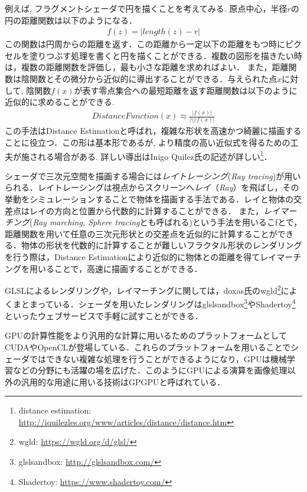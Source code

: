 例えば, フラグメントシェーダで円を描くことを考えてみる. 
原点中心，半径$r$の円の距離関数は以下のようになる．
\begin{eqnarray*}
 f(z) = | length(z) - r |
\end{eqnarray*}
この関数は円周からの距離を返す．この距離から一定以下の距離をもつ時にピクセルを塗りつぶす処理を書くと円を描くことができる．複数の図形を描きたい時は，複数の距離関数を評価し，最も小さな距離を求めればよい．
また，距離関数は陰関数とその微分から近似的に導出することができる．与えられた点$x$に対して, 陰関数$f(x)$が表す零点集合への最短距離を返す距離関数は以下のように近似的に求めることができる. 
\begin{eqnarray*}
 DistanceFunction(x) \approx \frac{|f(x)|}{|\bigtriangledown f(x)|}
\end{eqnarray*}
この手法はDistance Estimationと呼ばれ，複雑な形状を高速かつ綺麗に描画することに役立つ．この形は基本形であるが, より精度の高い近似式を得るための工夫が施される場合がある. 詳しい導出はInigo Quilez氏の記述が詳しい\footnote{distance estimation: \url{http://iquilezles.org/www/articles/distance/distance.htm}}．

シェーダで三次元空間を描画する場合には\emph{レイトレーシング}({\it Ray tracing})が用いられる．レイトレーシングは視点からスクリーンへ\emph{レイ}（{\it Ray}）を飛ばし，その挙動をシミュレーションすることで物体を描画する手法である．レイと物体の交差点はレイの方向と位置から代数的に計算することができる．
また，\emph{レイマーチング}({\it Ray marching, Sphere tracing}とも呼ばれる)\cite{sphereTracing}という手法を用いるこfとで，距離関数を用いて任意の三次元形状との交差点を近似的に計算することができる．物体の形状を代数的に計算することが難しいフラクタル形状のレンダリングを行う際は，Distance Estimationにより近似的に物体との距離を得てレイマーチングを用いることで，高速に描画することができる．

GLSLによるレンダリングや，レイマーチングに関しては，doxas氏のwgld\footnote{wgld: \url{https://wgld.org/d/glsl/}}によくまとまっている．シェーダを用いたレンダリングはglslsandbox\footnote{glslsandbox: \url{http://glslsandbox.com/}}やShadertoy\footnote{Shadertoy: \url{https://www.shadertoy.com/}}といったウェブサービスで手軽に試すことができる．

GPUの計算性能をより汎用的な計算に用いるためのプラットフォームとしてCUDAやOpenCLが登場している．これらのプラットフォームを用いることでシェーダではできない複雑な処理を行うことができるようになり，GPUは機械学習などの分野にも活躍の場を広げた．このようにGPUによる演算を画像処理以外の汎用的な用途に用いる技術はGPGPUと呼ばれている．

